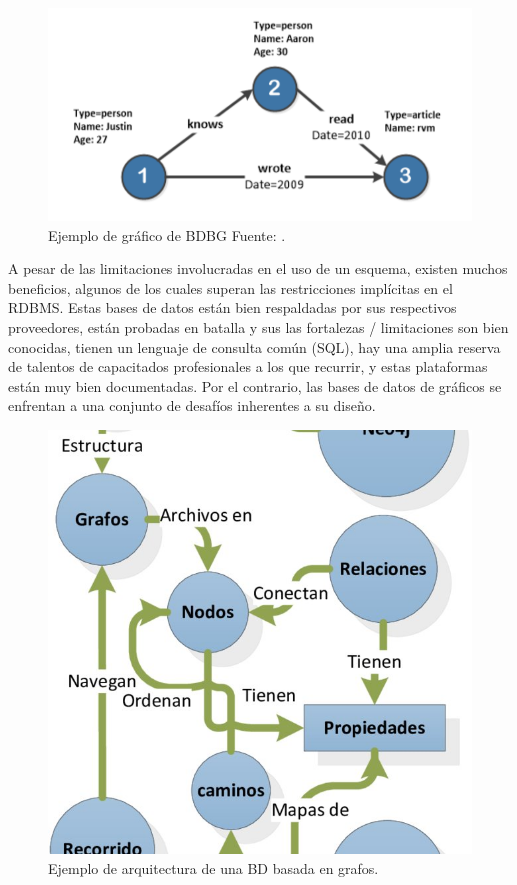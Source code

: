\begin{figure}[H]
    \centering
    \includegraphics[scale=0.7]{Graficos/ejempbd.png}
    \caption{Ejemplo de gráfico de BDBG  Fuente: \cite{miller2013graph}.}
    \label{fig:my_label}
\end{figure}
A pesar de las limitaciones involucradas en el uso de un esquema, existen muchos beneficios, algunos de los cuales superan las restricciones implícitas en
el RDBMS. Estas bases de datos están bien respaldadas por sus respectivos proveedores, están probadas en batalla y sus las fortalezas / limitaciones son bien conocidas, tienen un lenguaje de consulta común (SQL), hay una amplia reserva de talentos de capacitados profesionales a los que recurrir, y estas plataformas están muy bien documentadas. Por el contrario, las bases de datos de gráficos se enfrentan a una conjunto de desafíos inherentes a su diseño.
\begin{figure}[H]
    \centering
    \includegraphics[scale=1]{Graficos/dbgrafo.jpg}
    \caption{Ejemplo de arquitectura de una BD basada en grafos. }
    \label{fig:my_label}
\end{figure}
